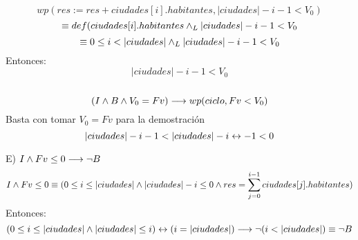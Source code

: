 \documentclass[10pt,a4paper]{article}
\begin{document}
\[wp(res:= res+ciudades[i].habitantes, |ciudades|-i-1<V_0) \]
\[\equiv def(ciudades[i].habitantes \land _L |ciudades|-i-1<V_0 \]
\[\equiv 0\leq i<|ciudades| \yLuego |ciudades|-i-1<V_0 \]
\hspace{1cm}Entonces:\\  \[ |ciudades|-i-1<V_0\]
\\
\[(I \land B\land V_0 = Fv) \longrightarrow wp(ciclo,Fv<V_0)\]
\hspace{1cm}Basta con tomar  $V_0 =Fv$  para  la  demostración  \\
\[|ciudades|-i-1<|ciudades|-i \Iff -1<0\]


\hspace{0.5cm}E) $I \land Fv \leq 0 \longrightarrow \neg B$\\
\[I \land Fv \leq 0 \equiv (0 \leq i \leq |ciudades| \land |ciudades|-i \leq 0 \land {res = \sum\limits_{j=0}^{i-1}ciudades[j].habitantes}) \\ \]
\hspace{1cm}Entonces:
\[ (0\leq i \leq |ciudades| \land |ciudades|\leq i) \Iff (i=|ciudades|) \implica \neg(i<|ciudades|) \equiv \neg B\] \\
\end{document}
